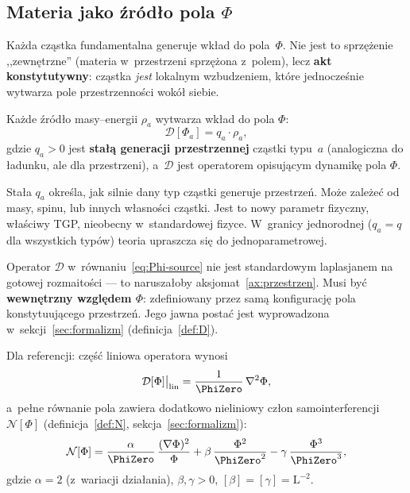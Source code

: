 \subsection{Materia jako \'zr\'od\l{}o pola $\Phi$}\label{ssec:zrodla}

Ka\.zda cz\k{a}stka fundamentalna generuje wk\l{}ad do pola~$\Phi$.
Nie jest to sprzężenie ,,zewn\k{e}trzne'' (materia w~przestrzeni
sprz\k{e}\.zona z~polem), lecz \textbf{akt konstytutywny}: cz\k{a}stka
\emph{jest} lokalnym wzbudzeniem, kt\'ore jednocze\'snie wytwarza
pole przestrzenno\'sci wok\'o\l{} siebie.

\begin{axiom}\label{ax:zrodlo}
Ka\.zde \'zr\'od\l{}o masy--energii $\rho_a$ wytwarza wk\l{}ad do pola $\Phi$:
\begin{equation}\label{eq:Phi-source}
    \mathcal{D}[\Phi_a] = q_a \cdot \rho_a,
\end{equation}
gdzie $q_a > 0$ jest \textbf{sta\l{}\k{a} generacji przestrzennej}
cz\k{a}stki typu~$a$ (analogiczna do \l{}adunku, ale dla przestrzeni),
a~$\mathcal{D}$ jest operatorem opisuj\k{a}cym dynamik\k{e} pola $\Phi$.
\end{axiom}

\begin{remark}
Sta\l{}a $q_a$ okre\'sla, jak silnie dany typ cz\k{a}stki generuje
przestrze\'n. Mo\.ze zale\.ze\'c od masy, spinu, lub innych w\l{}asno\'sci
cz\k{a}stki. Jest to nowy parametr fizyczny, w\l{}a\'sciwy TGP,
nieobecny w~standardowej fizyce. W~granicy jednorodnej
($q_a = q$ dla wszystkich typ\'ow) teoria upraszcza si\k{e}
do jednoparametrowej.
\end{remark}

\begin{remark}\label{rem:D-natura}
Operator $\mathcal{D}$ w~r\'ownaniu~\eqref{eq:Phi-source} nie jest
standardowym laplasjanem na gotowej rozmaito\'sci --- to
narusza\l{}oby aksjomat~\ref{ax:przestrzen}. Musi by\'c
\textbf{wewn\k{e}trzny wzgl\k{e}dem $\Phi$}: zdefiniowany
przez sam\k{a} konfiguracj\k{e} pola konstytuuj\k{a}cego
przestrze\'n. Jego jawna posta\'c jest wyprowadzona
w~sekcji~\ref{sec:formalizm} (definicja~\ref{def:D}).

Dla referencji: cz\k{e}\'s\'c liniowa operatora wynosi
\begin{equation}\label{eq:D-preview}
  \mathcal{D}[\Phi]\big|_{\mathrm{lin}}
  = \frac{1}{\PhiZero}\,\nabla^2\Phi,
\end{equation}
a~pe\l{}ne r\'ownanie pola zawiera dodatkowo nieliniowy cz\l{}on
samointerferencji $\mathcal{N}[\Phi]$ (definicja~\ref{def:N},
sekcja~\ref{sec:formalizm}):
\begin{equation}\label{eq:N-preview}
  \mathcal{N}[\Phi]
  = \frac{\alpha}{\PhiZero}\,\frac{(\nabla\Phi)^2}{\Phi}
  + \beta\,\frac{\Phi^2}{\PhiZero^2}
  - \gamma\,\frac{\Phi^3}{\PhiZero^3},
\end{equation}
gdzie $\alpha = 2$ (z~wariacji dzia\l{}ania),
$\beta, \gamma > 0$, $[\beta] = [\gamma] = \mathrm{L}^{-2}$.
\end{remark}

